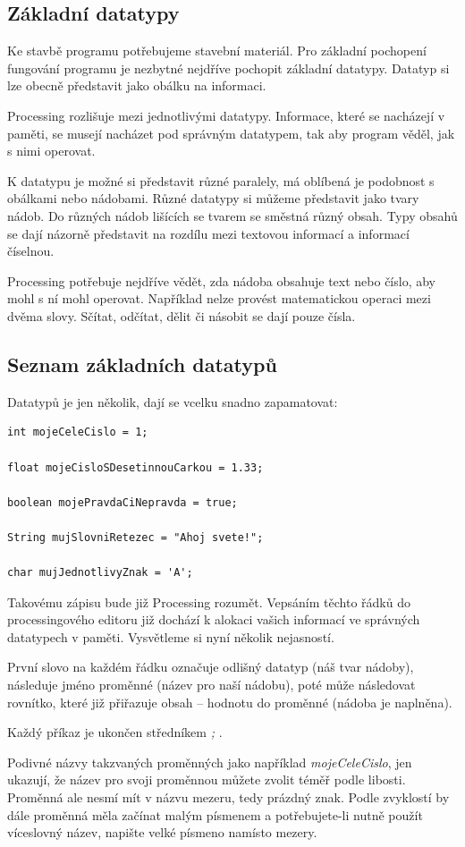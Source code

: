 \documentclass[10pt]{book}
\newcommand{\pododdil}[1]{\subsection{#1}\index{#1}\label{#1}}
\begin{document}
\pododdil{Základní datatypy}

Ke stavbě programu potřebujeme stavební materiál. Pro základní pochopení fungování programu je nezbytné nejdříve pochopit základní datatypy. Datatyp si lze obecně představit jako obálku na informaci.

Processing rozlišuje mezi jednotlivými datatypy. Informace, které se nacházejí v paměti, se musejí nacházet pod správným datatypem, tak aby program věděl, jak s nimi operovat.

K datatypu je možné si představit různé paralely, má oblíbená je podobnost s obálkami nebo nádobami. Různé datatypy si můžeme představit jako tvary nádob. Do různých nádob lišících se tvarem se směstná různý obsah. Typy obsahů se dají názorně představit na rozdílu mezi textovou informací a informací číselnou.

Processing potřebuje nejdříve vědět, zda nádoba obsahuje text nebo číslo, aby mohl s ní mohl operovat. Například nelze provést matematickou operaci mezi dvěma slovy. Sčítat, odčítat, dělit či násobit se dají pouze čísla.


\pododdil{Seznam základních datatypů}
Datatypů je jen několik, dají se vcelku snadno zapamatovat:

\begin{lstlisting}
int mojeCeleCislo = 1;

float mojeCisloSDesetinnouCarkou = 1.33;

boolean mojePravdaCiNepravda = true;

String mujSlovniRetezec = "Ahoj svete!";

char mujJednotlivyZnak = 'A';

\end{lstlisting}

Takovému zápisu bude již Processing rozumět. Vepsáním těchto řádků do processingového editoru již dochází k alokaci vašich informací ve správných datatypech v paměti. Vysvětleme si nyní několik nejasností.

První slovo na každém řádku označuje odlišný datatyp (náš tvar nádoby), následuje jméno proměnné (název pro naší nádobu), poté může následovat rovnítko, které již přiřazuje obsah -- hodnotu do proměnné (nádoba je naplněna).

Každý příkaz je ukončen středníkem {\em ;} .

Podivné názvy takzvaných proměnných jako například {\em mojeCeleCislo}, jen ukazují, že název pro svoji proměnnou můžete zvolit téměř podle libosti. Proměnná ale nesmí mít v názvu mezeru, tedy prázdný znak. Podle zvyklostí by dále proměnná měla začínat malým písmenem a potřebujete-li nutně použít víceslovný název, napište velké písmeno namísto mezery.
\end{document}
